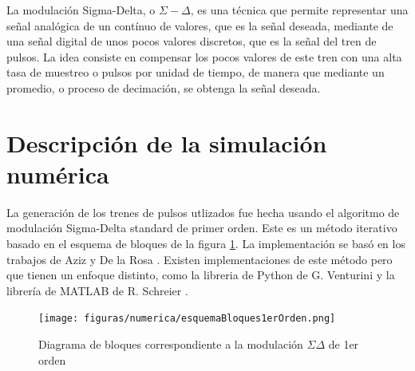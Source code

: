 \documentclass[twoside]{article}
\begin{document}
\begin{multicols}{2}
La modulación Sigma-Delta, o $\Sigma-\Delta$, \cite{delarosa2011} \cite{aziz1996} es una técnica que permite representar una señal analógica de un contínuo de valores, que es la señal deseada, mediante de una señal digital de unos pocos valores discretos, que es la señal del tren de pulsos. La idea consiste en compensar los pocos valores de este tren con una alta tasa de muestreo o pulsos por unidad de tiempo, de manera que mediante un promedio, o proceso de decimación, se obtenga la señal deseada. 



\section{Descripción de la simulación numérica}

La generación de los trenes de pulsos utlizados fue hecha usando el algoritmo de modulación Sigma-Delta standard de primer orden. Este es un método iterativo basado en el esquema de bloques de la figura \ref{fig:numerica_esquemaBloques1erOrden}. La implementación se basó en los trabajos de Aziz \cite{aziz1996} y De la Rosa \cite{delarosa2011}. Existen implementaciones de este método pero que tienen un enfoque distinto, como la libreria de Python de G. Venturini \cite{DSpython} y la librería de MATLAB de R. Schreier \cite{DSmatlab}.

\begin{figure}[H]
    \centering
    \texttt{[image: figuras/numerica/esquemaBloques1erOrden.png]}
    \caption{Diagrama de bloques correspondiente a la modulación $\Sigma\Delta$ de 1er orden}
    \label{fig:numerica_esquemaBloques1erOrden}
\end{figure}



\end{multicols}
\end{document}
